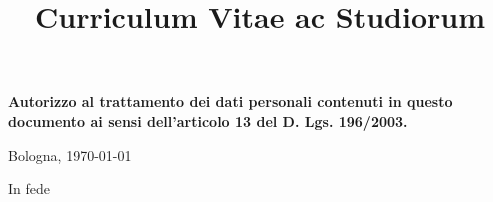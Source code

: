 \documentclass[12pt,a4paper]{moderncv} %
\title{Curriculum Vitae ac Studiorum}
\begin{document}
  \ifdefined\eng
  \else
  \fi
  
  \makecvtitle %

  

  
  
  

  

  

  

  

  



  \vspace*{\fill}
  \textbf{Autorizzo al trattamento dei dati personali contenuti in questo documento ai sensi dell'articolo 13 del D. Lgs. 196/2003.}

  \begin{flushright}
    Bologna, \today

   {
    In fede
  }{}

  \vspace*{0.5cm}


  \end{flushright}
\end{document}
